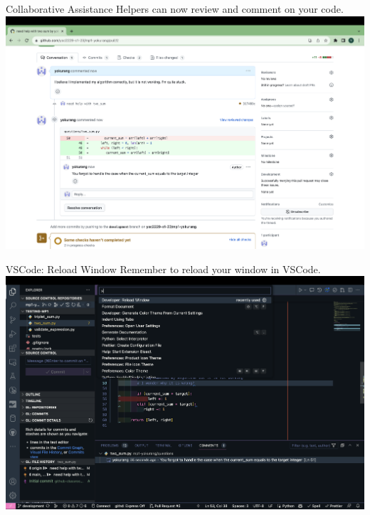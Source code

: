 \documentclass{beamer}
\begin{document}
\begin{frame}{Collaborative Assistance}
    Helpers can now review and comment on your code.
    \includegraphics[width=\textwidth,height=0.7\textheight,keepaspectratio]{assets/wait-for-comments-and-check.png}
\end{frame}

\begin{frame}{VSCode: Reload Window}
    Remember to reload your window in VSCode.
    \includegraphics[width=\textwidth,height=0.7\textheight,keepaspectratio]{assets/reload-your-window.png}
\end{frame}
\end{document}
